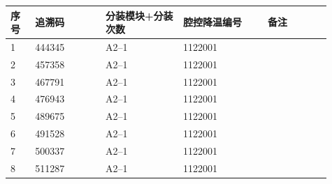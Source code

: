 \documentclass[UTF8,10pt,a4paper,fontset=fandol]{ctexart}
\newcommand{\fieldvalue}[1]{#1}
\begin{document}
\small
\begin{tabular}{|p{0.07\linewidth}|p{0.20\linewidth}|p{0.22\linewidth}|p{0.24\linewidth}|p{0.18\linewidth}|}
\hline
序号 & 追溯码 & 分装模块+分装次数 & 腔控降温编号 & 备注 \\
\hline
1 &
\fieldvalue{444345} &
\fieldvalue{A2--1} &
\fieldvalue{1122001} & \\
\hline
2 &
\fieldvalue{457358} &
\fieldvalue{A2--1} &
\fieldvalue{1122001} & \\
\hline
3 &
\fieldvalue{467791} &
\fieldvalue{A2--1} &
\fieldvalue{1122001} & \\
\hline
4 &
\fieldvalue{476943} &
\fieldvalue{A2--1} &
\fieldvalue{1122001} & \\
\hline
5 &
\fieldvalue{489675} &
\fieldvalue{A2--1} &
\fieldvalue{1122001} & \\
\hline
6 &
\fieldvalue{491528} &
\fieldvalue{A2--1} &
\fieldvalue{1122001} & \\
\hline
7 &
\fieldvalue{500337} &
\fieldvalue{A2--1} &
\fieldvalue{1122001} & \\
\hline
8 &
\fieldvalue{511287} &
\fieldvalue{A2--1} &
\fieldvalue{1122001} & \\

\end{tabular}
\end{document}
